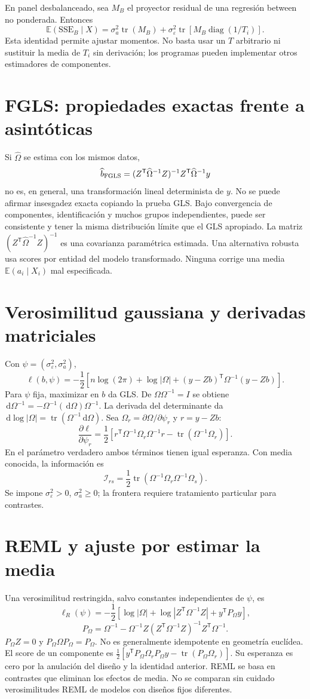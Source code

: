 \documentclass[11pt,a4paper]{article}
\newcommand{\E}{\mathbb E}
\newcommand{\dd}{\,\mathrm d}
\newcommand{\T}{^{\mathsf T}}
\DeclareMathOperator{\tr}{tr}
\DeclareMathOperator{\diag}{diag}
\theoremstyle{definition}
\newcommand{\eps}{\varepsilon}
\begin{document}
En panel desbalanceado, sea $M_B$ el proyector residual de una regresión between no ponderada. Entonces
\[
\E(\mathrm{SSE}_B\mid X)
=\sigma_a^2\tr(M_B)+
\sigma_\eps^2\tr[M_B\diag(1/T_i)].
\]
Esta identidad permite ajustar momentos. No basta usar un $T$ arbitrario ni sustituir la media de $T_i$ sin derivación; los programas pueden implementar otros estimadores de componentes.

\section{FGLS: propiedades exactas frente a asintóticas}
Si $\widehat\Omega$ se estima con los mismos datos,
\[
\widehat b_{\rm FGLS}
=(Z\T\widehat\Omega^{-1}Z)^{-1}Z\T\widehat\Omega^{-1}y
\]
no es, en general, una transformación lineal determinista de $y$.
No se puede afirmar insesgadez exacta copiando la prueba GLS.
Bajo convergencia de componentes, identificación y muchos grupos independientes, puede ser consistente y tener la misma distribución límite que el GLS apropiado. La matriz $(Z\T\widehat\Omega^{-1}Z)^{-1}$ es una covarianza paramétrica estimada. Una alternativa robusta usa scores por entidad del modelo transformado. Ninguna corrige una media $\E(a_i\mid X_i)$ mal especificada.

\section{Verosimilitud gaussiana y derivadas matriciales}
Con $\psi=(\sigma_\eps^2,\sigma_a^2)$,
\[
\ell(b,\psi)
=-\frac12[n\log(2\pi)+\log|\Omega|+
(y-Zb)\T\Omega^{-1}(y-Zb)].
\]
Para $\psi$ fija, maximizar en $b$ da GLS.
De $\Omega\Omega^{-1}=I$ se obtiene
$\dd\Omega^{-1}=-\Omega^{-1}(\dd\Omega)\Omega^{-1}$.
La derivada del determinante da
$\dd\log|\Omega|=\tr(\Omega^{-1}\dd\Omega)$.
Sea $\Omega_r=\partial\Omega/\partial\psi_r$ y $r=y-Zb$:
\[
\frac{\partial\ell}{\partial\psi_r}
=\frac12[r\T\Omega^{-1}\Omega_r\Omega^{-1}r
-\tr(\Omega^{-1}\Omega_r)].
\]
En el parámetro verdadero ambos términos tienen igual esperanza.
Con media conocida, la información es
\[
\mathcal I_{rs}=\frac12\tr(\Omega^{-1}\Omega_r\Omega^{-1}\Omega_s).
\]
Se impone $\sigma_\eps^2>0$, $\sigma_a^2\ge0$; la frontera requiere tratamiento particular para contrastes.

\section{REML y ajuste por estimar la media}
Una verosimilitud restringida, salvo constantes independientes de $\psi$, es
\[
\ell_R(\psi)=-\frac12[
\log|\Omega|+\log|Z\T\Omega^{-1}Z|+y\T P_\Omega y],
\]
\[
P_\Omega=\Omega^{-1}-\Omega^{-1}Z(Z\T\Omega^{-1}Z)^{-1}Z\T\Omega^{-1}.
\]
$P_\Omega Z=0$ y $P_\Omega\Omega P_\Omega=P_\Omega$.
No es generalmente idempotente en geometría euclídea.
El score de un componente es
$\tfrac12[y\T P_\Omega\Omega_rP_\Omega y-\tr(P_\Omega\Omega_r)]$.
Su esperanza es cero por la anulación del diseño y la identidad anterior.
REML se basa en contrastes que eliminan los efectos de media. No se comparan sin cuidado verosimilitudes REML de modelos con diseños fijos diferentes.
\end{document}
